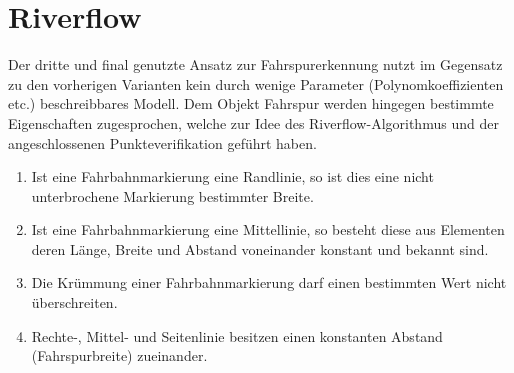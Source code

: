 \section{Riverflow}
Der dritte und final genutzte Ansatz zur Fahrspurerkennung nutzt im Gegensatz zu den vorherigen Varianten kein durch wenige Parameter (Polynomkoeffizienten etc.) beschreibbares Modell. Dem Objekt Fahrspur werden hingegen bestimmte Eigenschaften zugesprochen, welche zur Idee des Riverflow-Algorithmus \autocite{limRiverFlowLane2012} und der angeschlossenen Punkteverifikation geführt haben.
\begin{enumerate}
\item \label{item:riverflow:rule:solidline}
Ist eine Fahrbahnmarkierung eine Randlinie, so ist dies eine nicht unterbrochene Markierung bestimmter Breite.
\item \label{item:riverflow:rule:dashedline}
Ist eine Fahrbahnmarkierung eine Mittellinie, so besteht diese aus Elementen deren Länge, Breite und Abstand voneinander konstant und bekannt sind.
\item \label{item:riverflow:rule:curvature}
Die Krümmung einer Fahrbahnmarkierung darf einen bestimmten Wert nicht überschreiten.
\item \label{item:riverflow:rule:distance}
Rechte-, Mittel- und Seitenlinie besitzen einen konstanten Abstand (Fahrspurbreite) zueinander.
\end{enumerate} 


